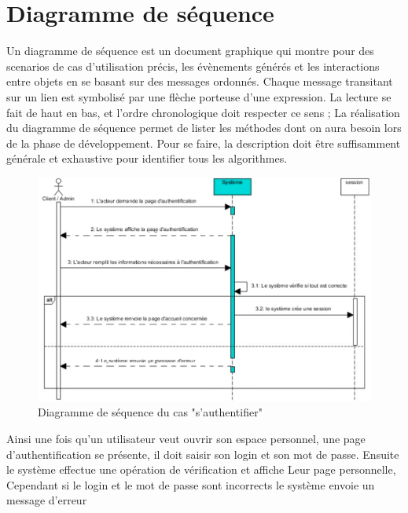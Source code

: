 \documentclass[a4paper, 12pt]{report}
\begin{document}
\section{Diagramme de séquence}
\noindent Un diagramme de séquence est un document graphique qui montre pour des scenarios de cas d’utilisation précis, les évènements générés et les interactions entre objets en se basant sur des messages ordonnés. Chaque message transitant sur un lien est symbolisé par une flèche porteuse d’une expression. La lecture se fait de haut en bas, et l’ordre chronologique doit respecter ce sens ;
La réalisation du diagramme de séquence permet de lister les méthodes dont on aura besoin lors de la phase de développement. Pour se faire, la description doit être suffisamment générale et exhaustive pour identifier tous les algorithmes.
\begin{figure}[H]
	\centering
	\includegraphics{img/sequence/1}
	\caption{Diagramme de séquence du cas "s'authentifier"}
	\label{Tux}
\end{figure}
\noindent Ainsi une fois qu’un utilisateur veut ouvrir son espace personnel, une page d’authentification se présente, il doit saisir son login et son mot de passe. Ensuite le système effectue une opération de vérification et affiche
Leur page personnelle, Cependant si le login et le mot de passe sont incorrects le système envoie un message d’erreur   
\end{document}
